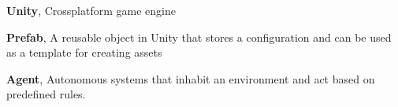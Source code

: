 \noindent
\label{itm:unity}\textbf{Unity}, Crossplatform game engine


\noindent
\label{itm:prefab}\textbf{Prefab}, A reusable object in Unity that stores a configuration and can be used as a template for creating assets

\noindent
\label{itm:agent}\textbf{Agent}, Autonomous systems that inhabit an environment and act based on predefined rules.